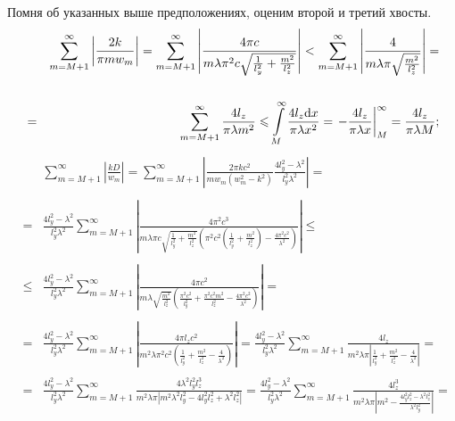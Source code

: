 Помня об указанных выше предположениях, оценим второй и третий хвосты.
\begin{eqnarray*}
  & & \sum \limits_{m=M+1}^{\infty} \left| \frac{2 k}{\pi m w_m} \right| =
  \sum \limits_{m=M+1}^{\infty} \left| \frac{4 \pi c}{m \lambda \pi^2 c \sqrt{\frac{1}{l_y^2} + \frac{m^2}{l_z^2}}} \right| <
  \sum \limits_{m=M+1}^{\infty} \left| \frac{4}{m \lambda \pi \sqrt{\frac{m^2}{l_z^2}}} \right| =\\
  \\
  &=&\sum \limits_{m=M+1}^{\infty} \frac{4 l_z}{\pi \lambda m^2} \leqslant
  \int \limits_M^{\infty} \frac{4 l_z \mathrm{d} x}{\pi \lambda x^2} =
  \left. - \frac{4 l_z}{\pi \lambda x} \right|_M^{\infty} =
  \frac{4 l_z}{\pi \lambda M};
\end{eqnarray*}
\begin{eqnarray*}
  &&\sum \limits_{m=M+1}^{\infty} \left| \frac{k D}{w_m} \right| =
  \sum \limits_{m=M+1}^{\infty} \left| \frac{2 \pi k c^2}{m w_m (w_m^2 - k^2)} \frac{4l_y^2 - \lambda^2}{l_y^2\lambda^2} \right| =\\
  \\
  &=& \frac{4l_y^2 - \lambda^2}{l_y^2\lambda^2} \sum \limits_{m=M+1}^{\infty} \left| \frac{4 \pi^2 c^3}{m \lambda \pi c \sqrt{\frac{1}{l_y^2} + \frac{m^2}{l_z^2}} \left( \pi^2 c^2 \left( \frac{1}{l_y^2} + \frac{m^2}{l_z^2} \right) - \frac{4 \pi^2 c^2}{\lambda^2} \right) } \right| \leq \\
  \\
  &\leq& \frac{4l_y^2 - \lambda^2}{l_y^2\lambda^2} \sum \limits_{m=M+1}^{\infty} \left| \frac{4 \pi c^2}{m \lambda \sqrt{\frac{m^2}{l_z^2}} \left( \frac{\pi^2 c^2}{l_y^2} + \frac{\pi^2 c^2 m^2}{l_z^2} - \frac{4 \pi^2 c^2}{\lambda^2} \right) } \right| =\\
  \\
  &=& \frac{4l_y^2 - \lambda^2}{l_y^2\lambda^2} \sum \limits_{m=M+1}^{\infty} \left| \frac{4 \pi l_z c^2}{m^2 \lambda \pi^2 c^2 \left( \frac{1}{l_y^2} + \frac{m^2}{l_z^2} - \frac{4}{\lambda^2} \right) } \right| = \frac{4l_y^2 - \lambda^2}{l_y^2\lambda^2} \sum \limits_{m=M+1}^{\infty}  \frac{4 l_z}{m^2 \lambda \pi \left| \frac{1}{l_y^2} + \frac{m^2}{l_z^2} - \frac{4}{\lambda^2} \right|} =\\
  \\
  &=& \frac{4l_y^2 - \lambda^2}{l_y^2\lambda^2} \sum \limits_{m=M+1}^{\infty}  \frac{4 \lambda^2 l_y^2 l_z^3}{m^2 \lambda \pi \left| m^2 \lambda^2 l_y^2 - 4 l_y^2 l_z^2 + \lambda^2 l_z^2 \right|} = \frac{4l_y^2 - \lambda^2}{l_y^2\lambda^2} \sum \limits_{m=M+1}^{\infty}  \frac{4 l_z^3}{m^2 \lambda \pi \left| m^2 - \frac{4 l_y^2 l_z^2 - \lambda^2 l_z^2}{\lambda^2 l_y^2} \right|} =\\

\end{eqnarray*}
